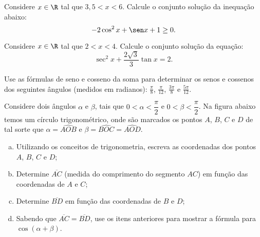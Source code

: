 \begin{exercise}
    Considere $x \in \R$ tal que $3{,}5 < x < 6$.
    Calcule o conjunto solução da inequação abaixo:
     $$-2 \cos^2 x + \sen x + 1 \geq 0.$$
\end{exercise}

\begin{exercise}
    Considere $x \in \R$ tal que $2 < x < 4$.
    Calcule o conjunto solução da equação:
    $$\sec^2 x + \dfrac{2 \sqrt 3}{3} \tan x = 2.$$
\end{exercise}

\begin{exercise}
    Use as fórmulas de seno e cosseno da soma para determinar os
senos e cossenos dos seguintes ângulos (medidos em radianos): $\frac
{\pi} 8$, $\frac{\pi} {12}$, $\frac {3\pi} 8$ e $\frac{5\pi}{12}$.
\end{exercise}

\begin{exercise}
  Considere dois ângulos $\alpha$ e $\beta$, tais que $0 < \alpha < \dfrac \pi 2$ e $0 < \beta < \dfrac \pi 2$. Na figura abaixo temos um círculo trigonométrico, onde são marcados os pontos $A$, $B$, $C$ e $D$ de tal sorte que $\alpha = \widehat{AOB}$ e $\beta = \widehat{BOC} = \widehat{AOD}$.
  \begin{center}
    \label{fig:cos-da-soma}
  \end{center}
  \begin{enumerate}[a)]
    \item Utilizando os conceitos de trigonometria, escreva as coordenadas dos pontos $A$, $B$, $C$ e $D$;
    \item Determine $\overline{AC}$ (medida do comprimento do segmento $AC$) em função das coordenadas de $A$ e $C$;
    \item Determine $\overline{BD}$ em função das coordenadas de $B$ e $D$;
    \item Sabendo que $\overline{AC} = \overline{BD}$, use os itens anteriores para mostrar a fórmula para $\cos (\alpha + \beta)$.
    \end{enumerate}
\end{exercise}

